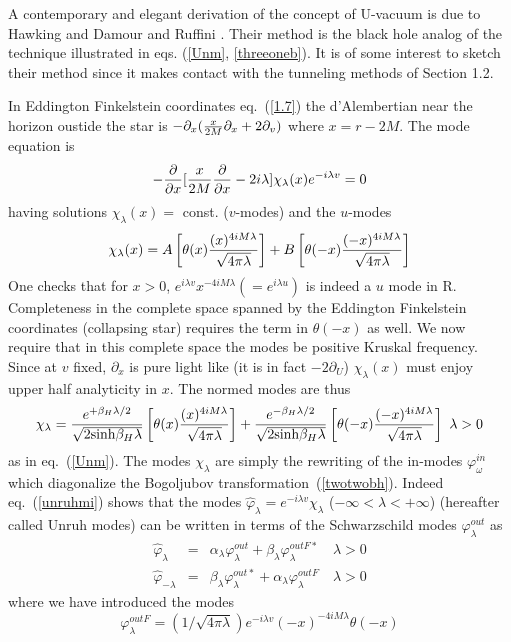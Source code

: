 \documentclass[12pt,oneside]{report}
\def\la{\lambda}
\begin{document}
   
A contemporary and elegant derivation of the concept of U-vacuum is
due to Hawking \cite{Hawk3} and Damour and Ruffini \cite{DaRu}.
Their method is the black hole
analog of the technique illustrated in eqs. (\ref {Unm}, \ref {threeoneb}). 
It is of some interest to sketch their method since it
makes contact with the tunneling methods of Section 1.2.

In  Eddington Finkelstein coordinates eq.~(\ref  {1.7}) 
the d'Alembertian near the
horizon oustide the star is $ - {\partial_x} ( {x \over 2 M}
{\partial_x} + 2\partial_v)$ where $ x = r - 2M$. The mode
equation is \begin {eqnarray}
- {\partial\over \partial x} [ {x \over 2M} {\partial \over \partial x} - 2
i \lambda] \chi_\lambda (x) e^{-i\lambda v} = 0 \label {1.44}
\end {eqnarray}
having solutions $ \chi_\lambda (x) = $ const. 
($v$-modes) and the $u$-modes 
\begin {eqnarray}
\chi_\lambda(x) =  A \left[ \theta (x) {(x)^{4 i M
\lambda} \over \sqrt {4 \pi \lambda}} \right] 
+ B \left[\theta (-x) {(- x )^{4i M \lambda}\over \sqrt {4 \pi \lambda}}
\right] 
\label {1.45}
\end {eqnarray}
One checks that for $ x> 0$, $e^{ i\lambda v} x^{-4 i M \lambda}( = e ^{i
\lambda u} )$ is indeed a $u$ mode in R. Completeness in the complete space
spanned by the  Eddington Finkelstein coordinates (collapsing star) requires the term in $ \theta
(- x)$ as well. We now require that in this complete space the modes be
positive Kruskal frequency. Since at $v$ fixed, $ \partial_x $ is
pure light like (it is in fact $-2 \partial_U  $)
$ \chi_\lambda
(x) $ must enjoy upper half analyticity in $x$. 
The normed modes
are thus
\begin{eqnarray}
\chi_\lambda = 
{e^{+\beta_H \lambda/2} \over \sqrt{ 2 \mbox{sinh} \beta_H \lambda}}
\left[
\theta(x) 
{(x)^{4 i M
\lambda} \over \sqrt {4 \pi \lambda}} \right] + 
{e^{-\beta_H \lambda/2} \over 
\sqrt{ 2 \mbox{sinh} \beta_H \lambda}}
\left[\theta (-x) {(- x )^{4i M \lambda}\over \sqrt {4 \pi \lambda}}
\right] 
\mbox{ $\lambda >0$}\nonumber \\
\label{unruhmi}
\end{eqnarray}
as in eq.~(\ref{Unm}). 
The modes $\chi_\lambda$ are simply the 
rewriting of the in-modes $\varphi_{\omega}^{in}$ which 
diagonalize the Bogoljubov transformation~(\ref{twotwobh}). 
Indeed eq.~(\ref{unruhmi}) shows that the modes $\hat \varphi_\la = e^{-i\la v}
\chi_\la$ ($-\infty < \la < + \infty$)  (hereafter called Unruh modes) can be written
in terms of the  Schwarzschild modes $\varphi_\la^{out}$ as
\begin{eqnarray}
\hat \varphi_\la &=& \alpha_\la \varphi_\la^{out} 
+ \beta_\la \varphi_\la^{out F *} \quad \la>0 \nonumber\\
\hat \varphi_{-\la} &=& \beta_\la \varphi_\la^{out *} 
+ \alpha_\la \varphi_\la^{out F }\quad \la>0 \label{unruhmii}
\end{eqnarray}
where we have introduced the modes \begin{equation}
\varphi_\la^{out F }
= (1/\sqrt{4 \pi \la})e^{-i\la v} (-x)^{-4 i M \la}\theta (-x)
\label{unruhmiii}\end{equation}
\end{document}
